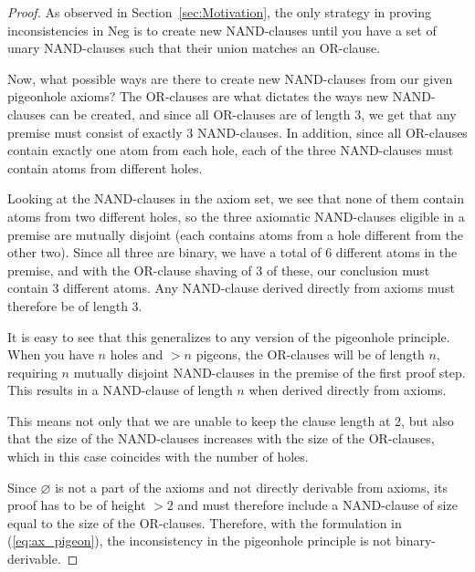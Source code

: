 \begin{proof}
As observed in Section~\ref{sec:Motivation}, the only strategy in proving inconsistencies in Neg is to create new NAND-clauses until you have a set of unary NAND-clauses such that their union matches an OR-clause.

Now, what possible ways are there to create new NAND-clauses from our given pigeonhole axioms?
The OR-clauses are what dictates the ways new NAND-clauses can be created, and since all OR-clauses are of length 3, we get that any premise must consist of exactly 3 NAND-clauses.
In addition, since all OR-clauses contain exactly one atom from each hole, each of the three NAND-clauses must contain atoms from different holes.

Looking at the NAND-clauses in the axiom set, we see that none of them contain atoms from two different holes, so the three axiomatic NAND-clauses eligible in a premise are mutually disjoint (each contains atoms from a hole different from the other two).
Since all three are binary, we have a total of 6 different atoms in the premise, and with the OR-clause shaving of 3 of these, our conclusion must contain 3 different atoms.
Any NAND-clause derived directly from axioms must therefore be of length 3.\par
\begin{figure}[!h]
  \centering
  \begin{prooftree*}
  \end{prooftree*}
  \caption{}
  \label{fig:pigeonhole_not_binary}
\end{figure}
It is easy to see that this generalizes to any version of the pigeonhole principle.
When you have $n$ holes and $>n$ pigeons, the OR-clauses will be of length $n$, requiring $n$ mutually disjoint NAND-clauses in the premise of the first proof step.
This results in a NAND-clause of length $n$ when derived directly from axioms.

This means not only that we are unable to keep the clause length at 2, but also that the size of the NAND-clauses increases with the size of the OR-clauses, which in this case coincides with the number of holes.

Since $\varnothing$ is not a part of the axioms and not directly derivable from axioms, its proof has to be of height $>2$ and must therefore include a NAND-clause of size equal to the size of the OR-clauses.
Therefore, with the formulation in (\ref{eq:ax_pigeon}), the inconsistency in the pigeonhole principle is not binary-derivable.
\end{proof}
